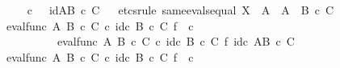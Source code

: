 \begin{isabellebody}
\isanewline
\ \ \isamarkupfalse%
\ {\isachardoublequoteopen}{\isasympsi}\isactrlsup {\isasymsharp}\ {\isasymcirc}\isactrlsub c\ {\isasymphi}\isactrlsup {\isasymsharp}\isactrlsup {\isasymsharp}\ {\isacharequal}{\kern0pt}\ id{\isacharparenleft}{\kern0pt}A\isactrlbsup {\isacharparenleft}{\kern0pt}B\ {\isasymtimes}\isactrlsub c\ C{\isacharparenright}{\kern0pt}\isactrlesup {\isacharparenright}{\kern0pt}{\isachardoublequoteclose}\isanewline
\ \ \isamarkupfalse%
{\isacharparenleft}{\kern0pt}etcs{\isacharunderscore}{\kern0pt}rule\ same{\isacharunderscore}{\kern0pt}evals{\isacharunderscore}{\kern0pt}equal{\isacharbrackleft}{\kern0pt}\ X\ {\isacharequal}{\kern0pt}\ {\isachardoublequoteopen}A{\isachardoublequoteclose}{\isacharcomma}{\kern0pt}\ \ A\ {\isacharequal}{\kern0pt}\ {\isachardoublequoteopen}{\isacharparenleft}{\kern0pt}B\ {\isasymtimes}\isactrlsub c\ C{\isacharparenright}{\kern0pt}{\isachardoublequoteclose}{\isacharbrackright}{\kern0pt}{\isacharparenright}{\kern0pt}\isanewline
\ \ \ \ \isamarkupfalse%
\ {\isachardoublequoteopen}eval{\isacharunderscore}{\kern0pt}func\ A\ {\isacharparenleft}{\kern0pt}B\ {\isasymtimes}\isactrlsub c\ C{\isacharparenright}{\kern0pt}\ {\isasymcirc}\isactrlsub c\ {\isacharparenleft}{\kern0pt}id\isactrlsub c\ {\isacharparenleft}{\kern0pt}B\ {\isasymtimes}\isactrlsub c\ C{\isacharparenright}{\kern0pt}\ {\isasymtimes}\isactrlsub f\ {\isacharparenleft}{\kern0pt}{\isasympsi}\isactrlsup {\isasymsharp}\ {\isasymcirc}\isactrlsub c\ {\isasymphi}\isactrlsup {\isasymsharp}\isactrlsup {\isasymsharp}{\isacharparenright}{\kern0pt}{\isacharparenright}{\kern0pt}\ {\isacharequal}{\kern0pt}\ \isanewline
\ \ \ \ \ \ \ \ \ \ eval{\isacharunderscore}{\kern0pt}func\ A\ {\isacharparenleft}{\kern0pt}B\ {\isasymtimes}\isactrlsub c\ C{\isacharparenright}{\kern0pt}\ {\isasymcirc}\isactrlsub c\ id\isactrlsub c\ {\isacharparenleft}{\kern0pt}B\ {\isasymtimes}\isactrlsub c\ C{\isacharparenright}{\kern0pt}\ {\isasymtimes}\isactrlsub f\ id\isactrlsub c\ {\isacharparenleft}{\kern0pt}A\isactrlbsup {\isacharparenleft}{\kern0pt}B\ {\isasymtimes}\isactrlsub c\ C{\isacharparenright}{\kern0pt}\isactrlesup {\isacharparenright}{\kern0pt}{\isachardoublequoteclose}\isanewline
\ \ \ \ \isamarkupfalse%
\ {\isacharminus}{\kern0pt}\isanewline
\ \ \ \ \ \ \isamarkupfalse%
\ {\isachardoublequoteopen}eval{\isacharunderscore}{\kern0pt}func\ A\ {\isacharparenleft}{\kern0pt}B\ {\isasymtimes}\isactrlsub c\ C{\isacharparenright}{\kern0pt}\ {\isasymcirc}\isactrlsub c\ {\isacharparenleft}{\kern0pt}id\isactrlsub c\ {\isacharparenleft}{\kern0pt}B\ {\isasymtimes}\isactrlsub c\ C{\isacharparenright}{\kern0pt}\ {\isasymtimes}\isactrlsub f\ {\isacharparenleft}{\kern0pt}{\isasympsi}\isactrlsup {\isasymsharp}\ {\isasymcirc}\isactrlsub c\ {\isasymphi}\isactrlsup {\isasymsharp}\isactrlsup {\isasymsharp}{\isacharparenright}{\kern0pt}{\isacharparenright}{\kern0pt}\ {\isacharequal}{\kern0pt}\isanewline

\end{isabellebody}
